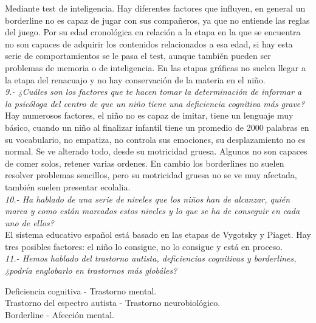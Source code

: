 \documentclass[letterpaper,12pt]{article}
\begin{document}
Mediante test de inteligencia. Hay diferentes factores que influyen, en
general un borderline no es capaz de jugar con sus compañeros, ya que no
entiende las reglas del juego. Por su edad cronológica en relación a la etapa
en la que se encuentra no son capaces de adquirir los contenidos relacionados
a esa edad, si hay esta serie de comportamientos se le pasa el test, aunque
también pueden ser problemas de memoria o de inteligencia. En las etapas
gráficas no suelen llegar a la etapa del renacuajo y no hay conservación de la
materia en el niño. \\

\textit{9.- ¿Cuáles son los factores que te hacen tomar la determinación de
informar a la psicóloga del centro de que un niño tiene una deficiencia
cognitiva más grave?} \\

Hay numerosos factores, el niño no es capaz de imitar, tiene un lenguaje
muy básico, cuando un niño al finalizar infantil tiene un promedio de 2000
palabras en su vocabulario, no empatiza, no controla sus emociones, su desplazamiento no es normal.
Se ve alterado todo, desde su motricidad gruesa. Algunos no son capaces
de comer solos, retener varias ordenes.
En cambio los borderlines no suelen resolver problemas sencillos, pero su
motricidad gruesa no se ve muy afectada, también suelen presentar ecolalia. \\

\textit{10.- Ha hablado de una serie de niveles que los niños han de alcanzar,
quién marca y como están marcados estos niveles y lo que se ha de
conseguir en cada uno de ellos?} \\

El sistema educativo español está basado en las etapas de Vygotsky y
Piaget. Hay tres posibles factores: el niño lo consigue, no lo consigue y está
en proceso. \\

\textit{11.- Hemos hablado del trastorno autista, deficiencias cognitivas y
borderlines, ¿podría englobarlo en trastornos más globáles?} \\

\begin{flushleft}
Deficiencia cognitiva - Trastorno mental.\\
Trastorno del espectro autista - Trastorno neurobiológico.\\
Borderline - Afección mental.\\
\end{flushleft}
\end{document}
